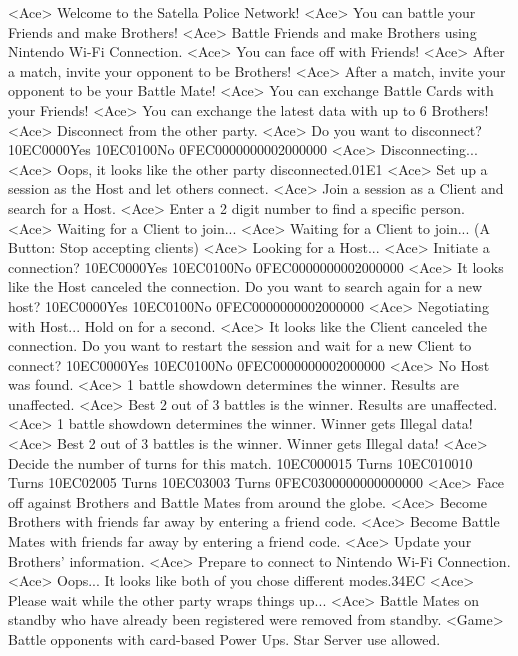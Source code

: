 <Ace> Welcome to the Satella Police Network! 
<Ace> You can battle your Friends and make Brothers!
<Ace> Battle Friends and make Brothers using Nintendo Wi-Fi Connection.
<Ace> You can face off with Friends!
<Ace> After a match, invite your opponent to be Brothers!
<Ace> After a match, invite your opponent to be your Battle Mate!
<Ace> You can exchange Battle Cards with your Friends!
<Ace> You can exchange the latest data with up to 6 Brothers!
<Ace> Disconnect from the other party.
<Ace> Do you want to disconnect? {10}{EC}{00}{00}Yes {10}{EC}{01}{00}No {0F}{EC}{00}{00}{00}{00}{02}{00}{00}{00}
<Ace> Disconnecting...
<Ace> Oops, it looks like the other party disconnected.{01}{E1}
<Ace> Set up a session as the Host and let others connect.
<Ace> Join a session as a Client and search for a Host.
<Ace> Enter a 2 digit number to find a specific person.
<Ace> Waiting for a Client to join...
<Ace> Waiting for a Client to join... (A Button: Stop accepting clients)
<Ace> Looking for a Host...
<Ace> Initiate a connection? {10}{EC}{00}{00}Yes {10}{EC}{01}{00}No {0F}{EC}{00}{00}{00}{00}{02}{00}{00}{00}
<Ace> It looks like the Host canceled the connection. 
Do you want to search again for a new host? {10}{EC}{00}{00}Yes {10}{EC}{01}{00}No {0F}{EC}{00}{00}{00}{00}{02}{00}{00}{00}
<Ace> Negotiating with Host... Hold on for a second.
<Ace> It looks like the Client canceled the connection. 
Do you want to restart the session and wait for a new Client to connect? {10}{EC}{00}{00}Yes {10}{EC}{01}{00}No {0F}{EC}{00}{00}{00}{00}{02}{00}{00}{00}
<Ace> No Host was found. 
<Ace> 1 battle showdown determines the winner. Results are unaffected.
<Ace> Best 2 out of 3 battles is the winner. Results are unaffected.
<Ace> 1 battle showdown determines the winner. Winner gets Illegal data!
<Ace> Best 2 out of 3 battles is the winner. Winner gets Illegal data!
<Ace> Decide the number of turns for this match. {10}{EC}{00}{00}15 Turns {10}{EC}{01}{00}10 Turns {10}{EC}{02}{00}5 Turns {10}{EC}{03}{00}3 Turns {0F}{EC}{03}{00}{00}{00}{00}{00}{00}{00}
<Ace> Face off against Brothers and Battle Mates from around the globe.
<Ace> Become Brothers with friends far away by entering a friend code.
<Ace> Become Battle Mates with friends far away by entering a friend code.
<Ace> Update your Brothers' information.
<Ace> Prepare to connect to Nintendo Wi-Fi Connection.
<Ace> Oops... It looks like both of you chose different modes.{34}{EC}
<Ace> Please wait while the other party wraps things up...
<Ace> Battle Mates on standby who have already been registered were removed from standby.
<Game> Battle opponents with card-based Power Ups. Star Server use allowed.
